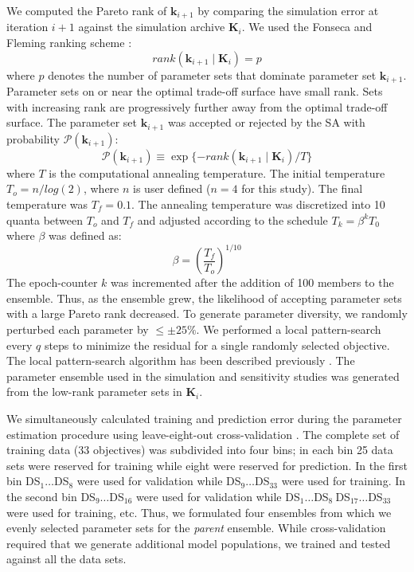 \documentclass[fleqn,10pt]{wlscirep}
\begin{document}
We computed the Pareto rank of $\mathbf{k}_{i+1}$ by comparing the simulation error at iteration $i+1$ against the simulation archive $\mathbf{K}_{i}$.
We used the Fonseca and Fleming ranking scheme \cite{fonseca1993genetic}:
\begin{equation}\label{eqn_rank}
rank\left(\mathbf{k}_{i+1}\mid \mathbf{K}_{i}\right)=p
\end{equation}
where $p$ denotes the number of parameter sets that dominate parameter set $\mathbf{k}_{i+1}$.
Parameter sets on or near the optimal trade-off surface have small rank.
Sets with increasing rank are progressively further away from the optimal trade-off surface.
The parameter set $\mathbf{k}_{i+1}$ was accepted or rejected by the SA with probability $\mathcal{P}\left(\mathbf{k}_{i+1}\right)$:
\begin{equation}\label{eqn_costMOSA}
\mathcal{P}(\mathbf{k}_{i+1}) \equiv \exp{\{-rank\left(\mathbf{k}_{i+1} \mid \mathbf{K}_{i} \right)/T\}}
\end{equation}
where $T$ is the computational annealing temperature.
The initial temperature $T_{o} = \mathit{n}/log(2)$, where $n$ is user defined ($n = 4$ for this study). The final temperature was $T_{f} = 0.1$.
The annealing temperature was discretized into 10 quanta between $T_{o}$ and $T_{f}$ and adjusted according to the schedule
$T_k = \beta^k T_0$
where $\beta$ was defined as:
\begin{equation}
	\beta = \left(\frac{T_{f}}{T_{o}}\right)^{1/10}
\end{equation}
The epoch-counter $k$ was incremented after the addition of 100 members to the ensemble.
Thus, as the ensemble grew, the likelihood of accepting parameter sets with a large Pareto rank decreased.
To generate parameter diversity, we randomly perturbed each parameter by $\leq\pm25\%$.
We performed a local pattern-search every $q$ steps to minimize the residual for a single randomly selected objective.
The local pattern-search algorithm has been described previously \cite{gadkar2003cybernetic, varner2000large}.
The parameter ensemble used in the simulation and sensitivity studies was generated from the low-rank parameter sets in $\mathbf{K}_{i}$.

We simultaneously calculated training and prediction error during the parameter estimation procedure using leave-eight-out cross-validation \cite{kohavi1995study}.
The complete set of training data (33 objectives) was subdivided into four bins; in each bin 25 data sets were reserved for training while eight were reserved for prediction.
In the first bin DS$_{1}\hdots$DS$_{8}$ were used for validation while DS$_{9}\hdots$DS$_{33}$ were used for training.
In the second bin DS$_{9}\hdots$DS$_{16}$ were used for validation while DS$_{1}\hdots$DS$_{8}~$DS$_{17}\hdots$DS$_{33}$ were used for training, etc.
Thus, we formulated four ensembles from which we evenly selected parameter sets for the \emph{parent} ensemble.
While cross-validation required that we generate additional model populations, we trained and tested against all the data sets.
\end{document}
